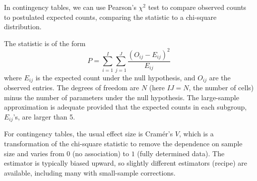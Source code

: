 \documentclass[
  11pt,
  letterpaper,
]{scrbook}
\theoremstyle{definition}
\theoremstyle{definition}
\theoremstyle{remark}
\begin{document}
In contingency tables, we can use Pearson's \(\chi^2\) test to compare
observed counts to postulated expected counts, comparing the statistic
to a chi-square distribution.

The statistic is of the form
\[P =\sum_{i=1}^I \sum_{j=1}^J \frac{(O_{ij}-E_{ij})^2}{E_{ij}}\] where
\(E_{ij}\) is the expected count under the null hypothesis, and
\(O_{ij}\) are the observed entries. The degrees of freedom are \(N\)
(here \(IJ=N\), the number of cells) minus the number of parameters
under the null hypothesis. The large-sample approximation is adequate
provided that the expected counts in each subgroup, \(E_{ij}\)'s, are
larger than 5.

For contingency tables, the usual effect size is Cramér's \(V\), which
is a transformation of the chi-square statistic to remove the dependence
on sample size and varies from \(0\) (no association) to \(1\) (fully
determined data). The estimator is typically biased upward, so slightly
different estimators (recipe) are available, including many with
small-sample corrections.
\end{document}
